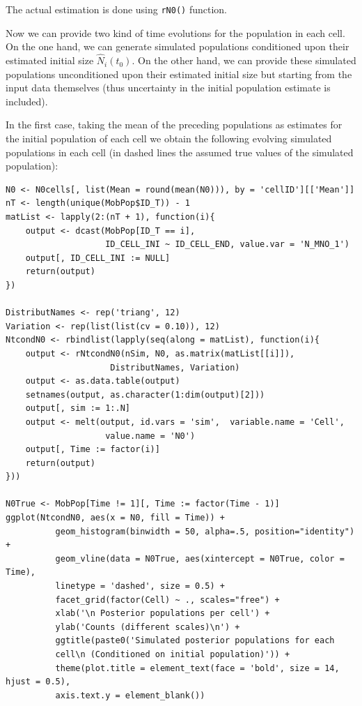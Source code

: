 \documentclass[12pt, a4paper]{article}
\begin{document}
The actual estimation is done using \texttt{rN0()} function.


Now we can provide two kind of time evolutions for the population in each cell. On the one hand, 
we can generate simulated populations conditioned upon their estimated initial size $\widehat{N}_{i}(t_{0})$. 
On the other hand, we can provide these simulated populations unconditioned upon their estimated 
initial size but starting from the input data themselves (thus uncertainty in the initial population estimate is included).

In the first case, taking the mean of the preceding populations as estimates for the initial population 
of each cell we obtain the following evolving simulated populations in each cell (in dashed lines the 
assumed true values of the simulated population):

\begin{verbatim}
N0 <- N0cells[, list(Mean = round(mean(N0))), by = 'cellID'][['Mean']]
nT <- length(unique(MobPop$ID_T)) - 1
matList <- lapply(2:(nT + 1), function(i){
    output <- dcast(MobPop[ID_T == i], 
                    ID_CELL_INI ~ ID_CELL_END, value.var = 'N_MNO_1')
    output[, ID_CELL_INI := NULL]
    return(output)
})

DistributNames <- rep('triang', 12)
Variation <- rep(list(list(cv = 0.10)), 12)
NtcondN0 <- rbindlist(lapply(seq(along = matList), function(i){
    output <- rNtcondN0(nSim, N0, as.matrix(matList[[i]]),  
                     DistributNames, Variation)
    output <- as.data.table(output)
    setnames(output, as.character(1:dim(output)[2]))
    output[, sim := 1:.N]
    output <- melt(output, id.vars = 'sim',  variable.name = 'Cell', 
                    value.name = 'N0')
    output[, Time := factor(i)]
    return(output)
}))

N0True <- MobPop[Time != 1][, Time := factor(Time - 1)]
ggplot(NtcondN0, aes(x = N0, fill = Time)) + 
          geom_histogram(binwidth = 50, alpha=.5, position="identity") + 
          geom_vline(data = N0True, aes(xintercept = N0True, color = Time), 
          linetype = 'dashed', size = 0.5) + 
          facet_grid(factor(Cell) ~ ., scales="free") +
          xlab('\n Posterior populations per cell') + 
          ylab('Counts (different scales)\n') +
          ggtitle(paste0('Simulated posterior populations for each 
          cell\n (Conditioned on initial population)')) +
          theme(plot.title = element_text(face = 'bold', size = 14, hjust = 0.5), 
          axis.text.y = element_blank())  
\end{verbatim}
\end{document}
